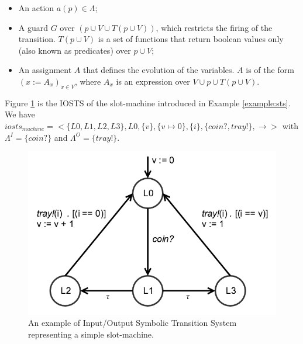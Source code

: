 \begin{definition}
\begin{itemize}
        \begin{itemize}
            \item An action $a(p) \in \Lambda$;

            \item A guard  $G$ over $(p \cup V \cup T(p \cup
                V))$, which restricts the firing of the
                transition. $T(p \cup V)$ is a set of functions
                that return boolean values only (also known as
                predicates) over $p \cup V$;

            \item An assignment $A$ that defines the evolution of
                the variables. $A$ is of the form $(x:=A_x)_{x\in
                V}$, where $A_x$ is an expression over $V \cup p
                \cup T(p \cup V)$.
        \end{itemize}
\end{itemize}
\end{definition}

\begin{example}
    Figure \ref{fig:iosts-example} is the IOSTS of the
    slot-machine introduced in Example \vref{example:sts}.  We
    have $iosts_{machine} = <\{L0, L1, L2, L3\}, L0, \{ v \}, \{
    v \mapsto 0 \}, \{ i \}, \{ coin?, tray! \}, \rightarrow >$
    with $\Lambda^I = \{ coin? \}$ and $\Lambda^O = \{ tray! \}$.

    \begin{figure}[ht]
        \begin{center}
            \includegraphics[width=0.7\linewidth]{figures/iosts-example.png}
        \end{center}

        \caption{An example of Input/Output Symbolic Transition
        System representing a simple slot-machine.}
        \label{fig:iosts-example}
    \end{figure}
\end{example}

